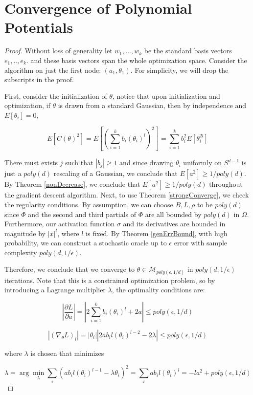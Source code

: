 \documentclass[11pt]{article}
\newcommand{\pd}[2]{\frac{\partial#1}{\partial#2}}
\begin{document}
\section{Convergence of Polynomial Potentials}


\polyConv*

\begin{proof}
Without loss of generality let $w_1,...,w_k$ be the standard basis vectors $e_1,..,e_k$. and these basis vectors span the whole optimization space. Consider the algorithm on just the first node: $(a_1,\theta_1)$. For simplicity, we will drop the subscripts in the proof. 

First, consider the initialization of $\theta$, notice that upon initialization and optimization, if $\theta$ is drawn from a standard Gaussian, then by independence and $E[\theta_i] = 0$,

\[E[C(\theta)^2] = E\left[\left(\sum_{i=1}^k  b_i (\theta_i)^l\right)^2\right] = \sum_{i=1}^k b_i^2E[\theta_i^{2l}]\]

There must exists $j$ such that $|b_j|\geq 1$ and since drawing $\theta_i$ uniformly on $S^{d-1}$ is just a $poly(d)$ rescaling of a Gaussian, we conclude that $E[a^2]\geq1/poly(d)$. By Theorem \ref{nonDecrease}, we conclude that $E[a^2] \geq 1/poly(d)$ throughout the gradient descent algorithm. Next, to use Theorem \ref{strongConverge}, we check the regularity conditions. By assumption, we can choose $B, L, \rho$ to be $poly(d)$ since $\Phi$ and the second and third partials of $\Phi$ are all bounded by $poly(d)$ in $\Omega$. Furthermore, our activation function $\sigma$ and its derivatives are bounded in magnitude by $|x|^{l}$, where $l$ is fixed. By Theorem \ref{genErrBound}, with high probability, we can construct a stochastic oracle up to $\epsilon$ error with sample complexity $poly(d,1/\epsilon)$.


Therefore, we conclude that we converge to $\theta \in \mathcal{M}_{poly(\epsilon,1/d)}$ in $poly(d,1/\epsilon)$ iterations. Note that this is a constrained optimization problem, so by introducing a Lagrange multiplier $\lambda$, the optimality conditions are:

\[|\pd{L}{a}| = |2\sum_{i=1}^k b_i (\theta_i)^l + 2a| \leq poly(\epsilon,1/d)\]

\[ |(\nabla_\theta L)_i| = |\theta_i||2ab_il(\theta_i)^{l-2}  -2\lambda| \leq poly(\epsilon,1/d)  \]

where $\lambda$ is chosen that minimizes 

\[\lambda = \arg \min_\lambda \sum_i (ab_i l (\theta_i)^{l-1} - \lambda\theta_i)^2 = \sum_i ab_i l (\theta_i)^l = -la^2 + poly(\epsilon,1/d) \]



\end{proof}
\end{document}
